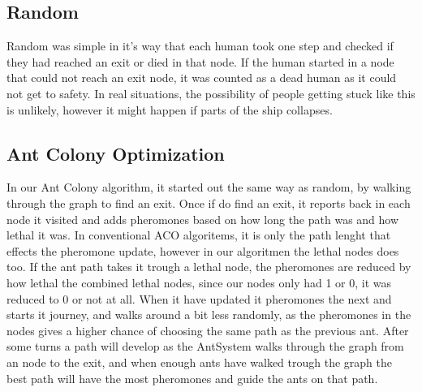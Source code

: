 \subsection{Random}
Random was simple in it's way that each human took one step and checked if they had reached an exit or died in that node. If the human started in a node that could not reach an exit node, it was counted as a dead human as it could not get to safety. In real situations, the possibility of people getting stuck like this is unlikely, however it might happen if parts of the ship collapses.

\subsection{Ant Colony Optimization}
In our Ant Colony algorithm, it started out the same way as random, by walking through the graph to find an exit. Once if do find an exit, it reports back in each node it visited and adds pheromones based on how long the path was and how lethal it was. In conventional ACO algoritems, it is only the path lenght that effects the pheromone update, however in our algoritmen the lethal nodes does too. If the ant path takes it trough a lethal node, the pheromones are reduced by how lethal the combined lethal nodes, since our nodes only had 1 or 0, it was reduced to 0 or not at all. When it have updated it pheromones the next and starts it journey, and walks around a bit less randomly, as the pheromones in the nodes gives a higher chance of choosing the same path as the previous ant. After some turns a path will develop as the AntSystem walks through the graph from an node to the exit, and when enough ants have walked trough the graph the best path will have the most pheromones and guide the ants on that path.







